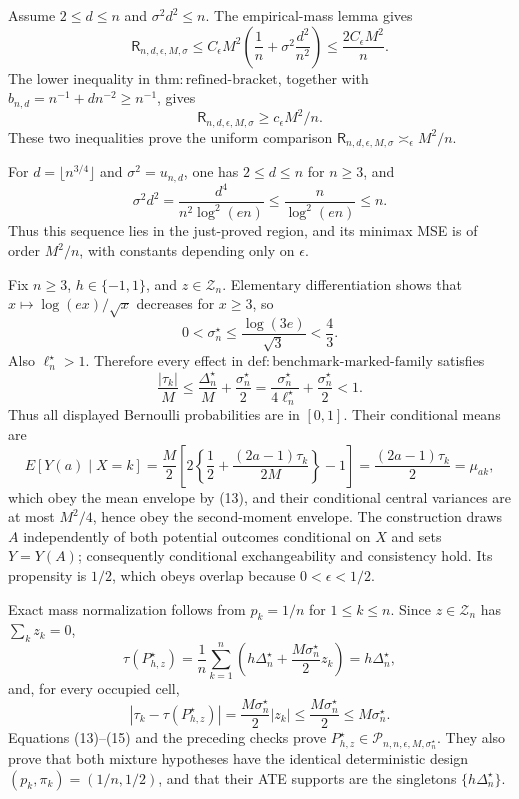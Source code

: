 Assume \(2\leq d\leq n\) and \(\sigma^2d^2\leq n\).  The empirical-mass lemma gives
\[
 \mathsf R_{n,d,\epsilon,M,\sigma}
 \leq C_{\epsilon}M^2\left(\frac1n+\sigma^2\frac{d^2}{n^2}\right)
 \leq \frac{2C_{\epsilon}M^2}{n}.
\]
The lower inequality in \(\mathrm{thm:refined\text{-}bracket}\), together with \(b_{n,d}=n^{-1}+dn^{-2}\geq n^{-1}\), gives
\[
 \mathsf R_{n,d,\epsilon,M,\sigma}\geq c_{\epsilon}M^2/n.
\]
These two inequalities prove the uniform comparison \(\mathsf R_{n,d,\epsilon,M,\sigma}\asymp_{\epsilon}M^2/n\).

For \(d=\lfloor n^{3/4}\rfloor\) and \(\sigma^2=u_{n,d}\), one has \(2\leq d\leq n\) for \(n\geq3\), and
\[
 \sigma^2d^2
 =\frac{d^4}{n^2\log^2(en)}
 \leq\frac{n}{\log^2(en)}\leq n.
\]
Thus this sequence lies in the just-proved region, and its minimax MSE is of order \(M^2/n\), with constants depending only on \(\epsilon\).

Fix \(n\geq3\), \(h\in\{-1,1\}\), and \(z\in\mathcal Z_n\).  Elementary differentiation shows that \(x\mapsto\log(ex)/\sqrt{x}\) decreases for \(x\geq3\), so
\[
 0<\sigma_n^\star\leq\frac{\log(3e)}{\sqrt3}<\frac43.
\]
Also \(\ell_n^\star>1\).  Therefore every effect in \(\mathrm{def:benchmark\text{-}marked\text{-}family}\) satisfies
\[
 \frac{|\tau_k|}{M}
 \leq\frac{\Delta_n^\star}{M}+\frac{\sigma_n^\star}{2}
 =\frac{\sigma_n^\star}{4\ell_n^\star}+\frac{\sigma_n^\star}{2}
 <1. \tag{13}
\]
Thus all displayed Bernoulli probabilities are in \([0,1]\).  Their conditional means are
\[
 E[Y(a)\mid X=k]
 =\frac M2\left[2\left\{\frac12+\frac{(2a-1)\tau_k}{2M}\right\}-1\right]
 =\frac{(2a-1)\tau_k}{2}=\mu_{ak},
\]
which obey the mean envelope by (13), and their conditional central variances are at most \(M^2/4\), hence obey the second-moment envelope.  The construction draws \(A\) independently of both potential outcomes conditional on \(X\) and sets \(Y=Y(A)\); consequently conditional exchangeability and consistency hold.  Its propensity is \(1/2\), which obeys overlap because \(0<\epsilon<1/2\).

Exact mass normalization follows from \(p_k=1/n\) for \(1\leq k\leq n\).  Since \(z\in\mathcal Z_n\) has \(\sum_kz_k=0\),
\[
 \tau(P_{h,z}^\star)
 =\frac1n\sum_{k=1}^n\left(h\Delta_n^\star+\frac{M\sigma_n^\star}{2}z_k\right)
 =h\Delta_n^\star, \tag{14}
\]
and, for every occupied cell,
\[
 |\tau_k-\tau(P_{h,z}^\star)|
 =\frac{M\sigma_n^\star}{2}|z_k|
 \leq\frac{M\sigma_n^\star}{2}
 \leq M\sigma_n^\star. \tag{15}
\]
Equations (13)--(15) and the preceding checks prove \(P_{h,z}^\star\in\mathcal P_{n,n,\epsilon,M,\sigma_n^\star}\).  They also prove that both mixture hypotheses have the identical deterministic design \((p_k,\pi_k)=(1/n,1/2)\), and that their ATE supports are the singletons \(\{h\Delta_n^\star\}\).

